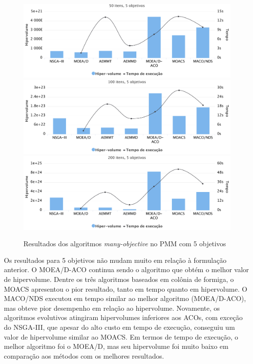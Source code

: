 \begin{figure}[!htbp]
	\includegraphics[width=1\textwidth]{cap_experimentos/figs/etapa4/i50o5}
	\includegraphics[width=1\textwidth]{cap_experimentos/figs/etapa4/i100o5}
	\includegraphics[width=1\textwidth]{cap_experimentos/figs/etapa4/i200o5}
	\caption{\label{fig_exp4_mkp_o5}Resultados dos algoritmos \textit{many-objective} no PMM com 5 objetivos}
\end{figure}

Os resultados para 5 objetivos não mudam muito em relação à formulação anterior. O MOEA/D-ACO continua sendo o algoritmo que obtém o melhor valor de hipervolume. Dentre os três algoritmos baseados em colônia de formiga, o MOACS apresentou o pior resultado, tanto em tempo quanto em hipervolume. O MACO/NDS executou em tempo similar ao melhor algoritmo (MOEA/D-ACO), mas obteve pior desempenho em relação ao hipervolume. Novamente, os algoritmos evolutivos atingiram hipervolumes inferiores aos ACOs, com exceção do NSGA-III, que apesar do alto custo em tempo de execução, conseguiu um valor de hipervolume similar ao MOACS. Em termos de tempo de execução, o melhor algoritmo foi o MOEA/D, mas seu hipervolume foi muito baixo em comparação aos métodos com os melhores resultados.


